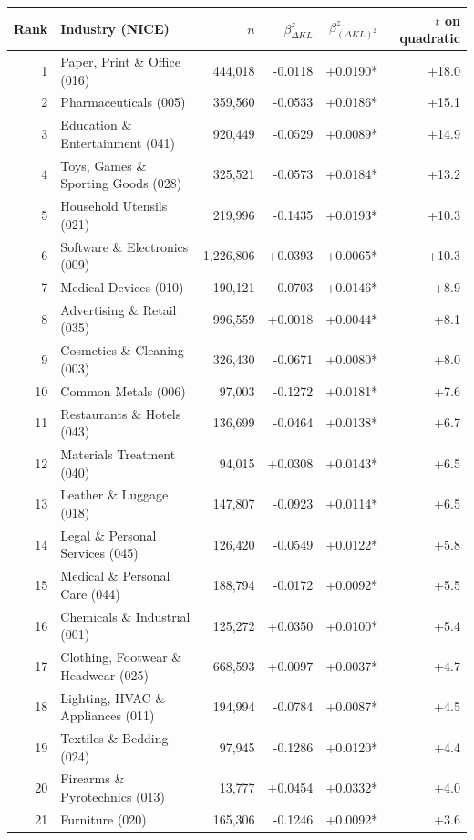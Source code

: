 \begin{tabular}{rlrrrr}
\toprule
Rank & Industry (NICE) & $n$ & $\beta_{\Delta KL}^z$ & $\beta_{(\Delta KL)^2}^z$ & $t$ on quadratic \\
\midrule
1 & Paper, Print \& Office (016) & 444,018 & -0.0118 & +0.0190* & +18.0 \\
2 & Pharmaceuticals (005) & 359,560 & -0.0533 & +0.0186* & +15.1 \\
3 & Education \& Entertainment (041) & 920,449 & -0.0529 & +0.0089* & +14.9 \\
4 & Toys, Games \& Sporting Goods (028) & 325,521 & -0.0573 & +0.0184* & +13.2 \\
5 & Household Utensils (021) & 219,996 & -0.1435 & +0.0193* & +10.3 \\
6 & Software \& Electronics (009) & 1,226,806 & +0.0393 & +0.0065* & +10.3 \\
7 & Medical Devices (010) & 190,121 & -0.0703 & +0.0146* & +8.9 \\
8 & Advertising \& Retail (035) & 996,559 & +0.0018 & +0.0044* & +8.1 \\
9 & Cosmetics \& Cleaning (003) & 326,430 & -0.0671 & +0.0080* & +8.0 \\
10 & Common Metals (006) & 97,003 & -0.1272 & +0.0181* & +7.6 \\
11 & Restaurants \& Hotels (043) & 136,699 & -0.0464 & +0.0138* & +6.7 \\
12 & Materials Treatment (040) & 94,015 & +0.0308 & +0.0143* & +6.5 \\
13 & Leather \& Luggage (018) & 147,807 & -0.0923 & +0.0114* & +6.5 \\
14 & Legal \& Personal Services (045) & 126,420 & -0.0549 & +0.0122* & +5.8 \\
15 & Medical \& Personal Care (044) & 188,794 & -0.0172 & +0.0092* & +5.5 \\
16 & Chemicals \& Industrial (001) & 125,272 & +0.0350 & +0.0100* & +5.4 \\
17 & Clothing, Footwear \& Headwear (025) & 668,593 & +0.0097 & +0.0037* & +4.7 \\
18 & Lighting, HVAC \& Appliances (011) & 194,994 & -0.0784 & +0.0087* & +4.5 \\
19 & Textiles \& Bedding (024) & 97,945 & -0.1286 & +0.0120* & +4.4 \\
20 & Firearms \& Pyrotechnics (013) & 13,777 & +0.0454 & +0.0332* & +4.0 \\
21 & Furniture (020) & 165,306 & -0.1246 & +0.0092* & +3.6 \\

\end{tabular}
